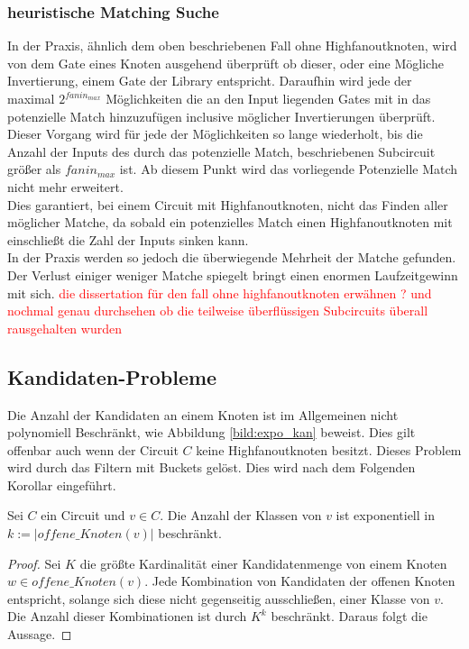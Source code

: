 \documentclass[11pt, a4paper, german]{article}
\begin{document}
\subsubsection{heuristische Matching Suche}
In der Praxis, ähnlich dem oben beschriebenen Fall ohne Highfanoutknoten, wird von dem Gate eines Knoten ausgehend überprüft ob dieser, oder eine Mögliche Invertierung, einem Gate der Library entspricht. Daraufhin wird jede der maximal $2^{fanin_{max}}$ Möglichkeiten die an den Input liegenden Gates mit in das potenzielle Match hinzuzufügen inclusive möglicher Invertierungen überprüft. Dieser Vorgang wird für jede der Möglichkeiten so lange wiederholt, bis die Anzahl der Inputs des durch das potenzielle Match,  beschriebenen Subcircuit größer als $fanin_{max}$ ist. Ab diesem Punkt wird das vorliegende Potenzielle Match nicht mehr erweitert. \\
Dies garantiert, bei einem Circuit mit Highfanoutknoten, nicht das Finden aller möglicher Matche, da sobald ein potenzielles Match einen Highfanoutknoten mit einschließt die Zahl der Inputs sinken kann. \\
In der Praxis werden so jedoch die überwiegende Mehrheit der Matche gefunden. Der Verlust einiger weniger Matche spiegelt bringt einen enormen Laufzeitgewinn mit sich.
\textcolor{red}{die dissertation für den fall ohne highfanoutknoten erwähnen ? und nochmal genau durchsehen ob die teilweise überflüssigen Subcircuits überall rausgehalten wurden }


\subsection{Kandidaten-Probleme}
Die Anzahl der Kandidaten an einem Knoten ist im Allgemeinen nicht polynomiell Beschränkt, wie Abbildung \ref{bild:expo_kan} beweist. Dies gilt offenbar auch wenn der Circuit $C$ keine Highfanoutknoten besitzt. Dieses Problem wird durch das Filtern mit Buckets gelöst. Dies wird nach dem Folgenden Korollar eingeführt. 
\begin{cor}
Sei $C$ ein Circuit und $v \in C$. Die Anzahl der Klassen von $v$ ist exponentiell in $k:= |offene\_Knoten(v)|$ beschränkt.
\end{cor}
\begin{proof}
Sei $K$ die größte Kardinalität einer Kandidatenmenge von einem Knoten $w\in offene\_Knoten(v)$. Jede Kombination von Kandidaten der offenen Knoten entspricht, solange sich diese nicht gegenseitig ausschließen, einer Klasse von $v$. Die Anzahl dieser Kombinationen ist durch $K^k$ beschränkt. Daraus folgt die Aussage.
\end{proof}
\end{document}
